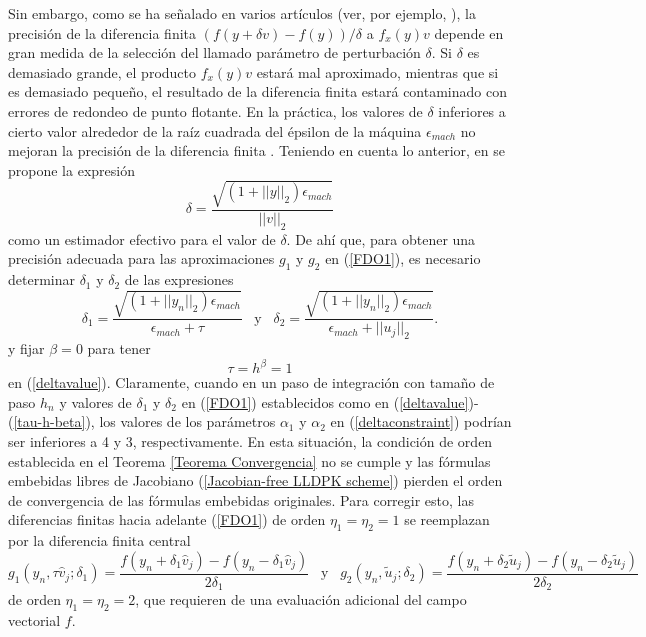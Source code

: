 Sin embargo, como se ha señalado en varios artículos (ver, por ejemplo, \cite{chan1984nonlinearly,knoll2004jacobian}), la precisión de la diferencia finita $(f(y+\delta v)-f(y))/ \delta$ a $f_x(y)v$ depende en gran medida de la selección del llamado parámetro de perturbación $\delta$. Si $\delta$ es demasiado grande, el producto $f_x(y)v$ estará mal aproximado, mientras que si es demasiado pequeño, el resultado de la diferencia finita estará contaminado con errores de redondeo de punto flotante. En la práctica, los valores de $\delta$ inferiores a cierto valor alrededor de la raíz cuadrada del épsilon de la máquina  $\epsilon_{mach}$ no mejoran la precisión de la diferencia finita \cite{knoll2004jacobian}.
Teniendo en cuenta lo anterior, en \cite{knoll2004jacobian} se propone la expresión 
\[ \delta = \frac{\sqrt{(1+||y||_2)\epsilon_{mach}}}{||v||_2} \]
como un estimador efectivo para el valor de $\delta$. De ahí que, para obtener una precisión adecuada para las aproximaciones $g_1$ y $g_2$ en (\ref{FDO1}), es necesario determinar $\delta_1$ y $\delta_2$ de las expresiones
\begin{equation} \label{deltavalue}
	\delta_1 = \frac{\sqrt{(1+||y_n||_2)\epsilon_{mach}}}{\epsilon_{mach}+\tau}
	\;\;\; \text{y} \;\;\; \delta_2 = \frac{\sqrt{(1+||y_n||_2)\epsilon_{mach}}}{\epsilon_{mach}+||u_j||_2}.
\end{equation}
y fijar $\beta=0$ para tener
\begin{equation}
	\tau = h^\beta=1 \label{tau-h-beta}
\end{equation}
en (\ref{deltavalue}). Claramente, cuando en un paso de integración con tamaño de paso $h_n$ y valores de $\delta_1$ y $\delta_2$ en (\ref{FDO1}) establecidos como en (\ref{deltavalue})-(\ref{tau-h-beta}), los valores de los parámetros $ \alpha_1$ y $\alpha_2$ en (\ref{deltaconstraint}) podrían ser inferiores a 4 y 3, respectivamente. En esta situación, la condición de orden establecida en el Teorema \ref{Teorema Convergencia} no se cumple y las fórmulas embebidas libres de Jacobiano (\ref{Jacobian-free LLDPK scheme}) pierden el orden de convergencia de las fórmulas embebidas originales. Para corregir esto, las diferencias finitas hacia adelante (\ref{FDO1}) de orden $\eta_1=\eta_2=1$ se reemplazan por la diferencia finita central
\begin{equation*}
	g_1(y_n,\tau \widehat{v}_j;\delta_1)=\frac{f(y_n+\delta_1\widehat{v}_j)-f(y_n-\delta_1 \widehat{v}_j)}{2\delta_1}  \;\;\; \text{y} \;\;\; g_2(y_n,\widetilde{u}_j;\delta_2)=\frac{f(y_n+\delta_2  \widetilde{u}_j)-f(y_n-\delta_2 \widetilde{u}_j)}{2\delta_2}
\end{equation*}
de orden $\eta_1=\eta_2=2$, que requieren de una evaluación adicional del campo vectorial $f$.

